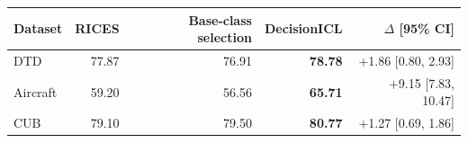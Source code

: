 \begin{tabular}{lrrrr}
\toprule
Dataset & RICES & Base-class selection & DecisionICL & $\Delta$ [95\% CI] \\
\midrule
DTD & 77.87 & 76.91 & \textbf{78.78} & +1.86 [0.80, 2.93] \\
Aircraft & 59.20 & 56.56 & \textbf{65.71} & +9.15 [7.83, 10.47] \\
CUB & 79.10 & 79.50 & \textbf{80.77} & +1.27 [0.69, 1.86] \\
\bottomrule
\end{tabular}
